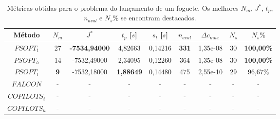 \begin{table}
	\centering
	\caption[Métricas obtidas para o problema do foguete]{Métricas obtidas para o problema do lançamento de um foguete. Os melhores $ N_m $, $ J^* $, $ t_p $, $ n_{aval} $ e $ N_s\% $ se encontram destacados.}
	\label{tab:foguete:raw}
	\begin{tabular}{@{}ccccccccc@{}}
		\toprule
		Método       & $N_m$                             & $J^*$                                       & $t_p$ {[}$s${]}                         & $s_t$ {[}$s${]}                         & $n_{aval}$                          & $\Delta c_{max}$                         & $N_s$ & $N_s\%$                                  \\ \midrule
		$PSOPT_t$    & 27                                & {\color[HTML]{009901} \textbf{-7534,94000}} & 4,82663                                 & 0,14216                                 & {\color[HTML]{009901} \textbf{331}} & 1,35e-08                                 & 30    & {\color[HTML]{009901} \textbf{100,00\%}} \\
		$PSOPT_h$    & 14                                & -7532,49000                                 & 2,34095                                 & 0,12260 & 364                                 & 1,35e-08                                 & 30    & {\color[HTML]{009901} \textbf{100,00\%}} \\
		$PSOPT_l$    & {\color[HTML]{009901} \textbf{9}} & -7532,18000                                 & {\color[HTML]{009901} \textbf{1,88649}} & 0,14480                                 & 475                                 & 2,55e-10 & 29    & 96,67\%                                  \\
		$FALCON$     & -                                 & -                                           & -                                       & -                                       & -                                   & -                                        & -     & -                                        \\
		$COPILOTS_t$ & -                                 & -                                           & -                                       & -                                       & -                                   & -                                        & -     & -                                        \\
		$COPILOTS_h$ & -                                 & -                                           & -                                       & -                                       & -                                   & -                                        & -     & -                                        \\ \bottomrule
	\end{tabular}
\end{table}